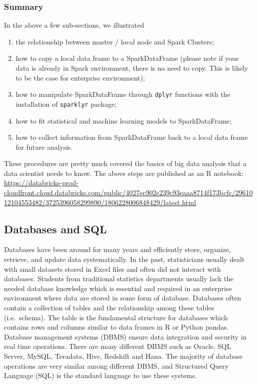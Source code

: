 \documentclass[
]{article}
\begin{document}
\hypertarget{summary}{%
\subsubsection{Summary}\label{summary}}

In the above a few sub-sections, we illustrated

\begin{enumerate}
\def\labelenumi{(\arabic{enumi})}
\item
  the relationship between master / local node and Spark Clusters;
\item
  how to copy a local data frame to a SparkDataFrame (please note if
  your data is already in Spark environment, there is no need to copy.
  This is likely to be the case for enterprise environment);
\item
  how to manipulate SparkDataFrame through \texttt{dplyr} functions with
  the installation of \texttt{sparklyr} package;
\item
  how to fit statistical and machine learning models to SparkDataFrame;
\item
  how to collect information from SparkDataFrame back to a local data
  frame for future analysis.
\end{enumerate}

These procedures are pretty much covered the basics of big data analysis
that a data scientist needs to know. The above steps are published as an
R notebook:
\url{https://databricks-prod-cloudfront.cloud.databricks.com/public/4027ec902e239c93eaaa8714f173bcfc/2961012104553482/3725396058299890/1806228006848429/latest.html}

\hypertarget{databases-and-sql}{%
\subsection{Databases and SQL}\label{databases-and-sql}}

Databases have been around for many years and efficiently store,
organize, retrieve, and update data systematically. In the past,
statisticians usually dealt with small datasets stored in Excel files
and often did not interact with databases. Students from traditional
statistics departments usually lack the needed database knowledge which
is essential and required in an enterprise environment where data are
stored in some form of database. Databases often contain a collection of
tables and the relationship among these tables (i.e.~schema). The table
is the fundamental structure for databases which contains rows and
columns similar to data frames in R or Python pandas. Database
management systems (DBMS) ensure data integration and security in real
time operations. There are many different DBMS such as Oracle, SQL
Server, MySQL, Teradata, Hive, Redshift and Hana. The majority of
database operations are very similar among different DBMS, and
Structured Query Language (SQL) is the standard language to use these
systems.
\end{document}
